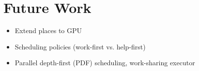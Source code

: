 
\chapter{Future Work}
\label{chap:locality-future-work}


\begin{itemize}
\item Extend places to GPU
\item Scheduling policies (work-first vs. help-first)
\item Parallel depth-first (PDF) scheduling, work-sharing executor
\end{itemize}

